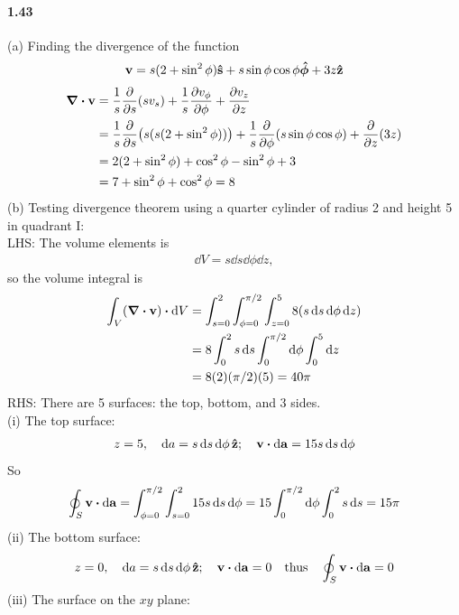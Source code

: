 \documentclass[../main.tex]{subfiles}
\begin{document}
\paragraph{1.43}
(a) Finding the divergence of the function
\begin{align*}
    \vb{v} = s(2 + \sin^2\phi) \vu{s} + s \sin\phi \cos\phi \vu*{\phi} + 3z \vu{z}
\end{align*}
\begin{align*}
    \div{\vb{v}} &= \frac{1}{s} \pdv{s} (s v_s) + \frac{1}{s} \pdv{v_{\phi}}{\phi} + \pdv{v_z}{z} \\
    &= \frac{1}{s} \pdv{s} (s (s(2 + \sin^2\phi)))
        + \frac{1}{s} \pdv{\phi} (s \sin\phi \cos\phi) + \pdv{z} (3z) \\
    &= 2(2 + \sin^2\phi) + \cos^2\phi - \sin^2\phi + 3 \\
    &= 7 + \sin^2\phi + \cos^2\phi = 8
\end{align*}
(b) Testing divergence theorem using a quarter cylinder of radius 2 and height 5 in quadrant I: \\
LHS: The volume elements is
\begin{align*}
    \dd{V} = s \dd{s}\dd{\phi}\dd{z},
\end{align*}
so the volume integral is
\begin{align*}
    \int_V (\div{\vb{v}}) \vdot \dd{V} &= \int_{s=0}^2 \int_{\phi=0}^{\pi/2} \int_{z=0}^5
        8 (s \dd{s}\dd{\phi}\dd{z}) \\
    &= 8 \int_0^2 s \dd{s} \int_0^{\pi/2} \dd{\phi} \int_0^5 \dd{z} \\
    &= 8 (2) (\pi/2) (5) = 40\pi
\end{align*}
RHS: There are 5 surfaces: the top, bottom, and 3 sides. \\
(i) The top surface:
\begin{align*}
    z = 5, \quad \dd{a} = s \dd{s}\dd{\phi} \vu{z}; \quad 
    \vb{v} \vdot \dd{\vb{a}} = 15 s \dd{s}\dd{\phi}
\end{align*}
So
\begin{align*}
    \oint_S \vb{v} \vdot \dd{\vb{a}} = \int_{\phi=0}^{\pi/2} \int_{s=0}^2 15 s \dd{s}\dd{\phi}
    = 15 \int_0^{\pi/2} \dd{\phi} \int_0^2 s \dd{s} = 15 \pi
\end{align*}
(ii) The bottom surface:
\begin{align*}
    z = 0, \quad \dd{a} = s \dd{s}\dd{\phi} \vu{z}; \quad \vb{v} \vdot \dd{\vb{a}} = 0
    \qq{thus} \oint_S \vb{v} \vdot \dd{\vb{a}} = 0
\end{align*}
(iii) The surface on the $xy$ plane:
\end{document}
